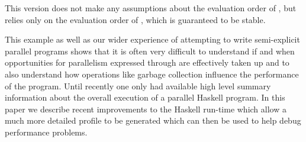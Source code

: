 This version does not make any assumptions about the evaluation order
of \codef{+}, but relies only on the evaluation order of ,
which is guaranteed to be stable.

This example as well as our wider experience of attempting to write semi-explicit parallel programs shows that it is often very difficult to understand if and when opportunities for parallelism expressed through  are effectively taken up and to also understand how operations like garbage collection influence the performance of the program. Until recently one only had available high level summary information about the overall execution of a parallel Haskell program. In this paper we describe recent improvements to the Haskell run-time which allow a much more detailed profile to be generated which can then be used to help debug performance problems.
